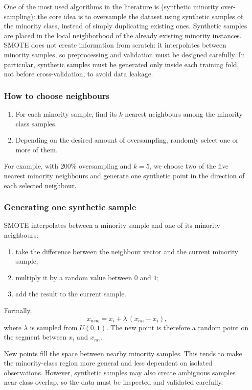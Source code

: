 One of the most used algorithms in the literature is  (synthetic minority over-sampling): the core idea is to oversample the dataset using synthetic samples of the minority class, instead of simply duplicating existing ones. Synthetic samples are placed in the local neighborhood of the already existing minority instances. SMOTE does not create information from scratch: it interpolates between minority samples, so preprocessing and validation must be designed carefully. In particular, synthetic samples must be generated only inside each training fold, not before cross-validation, to avoid data leakage.

\subsubsection{How to choose neighbours}

\begin{enumerate}
  \item For each minority sample, find its $k$ nearest neighbours among the minority class samples.
  \item Depending on the desired amount of oversampling, randomly select one or more of them.
\end{enumerate}
For example, with $200\%$ oversampling and $k = 5$, we choose two of the five nearest minority neighbours and generate one synthetic point in the direction of each selected neighbour.

\subsubsection{Generating one synthetic sample}

SMOTE interpolates between a minority sample and one of its minority neighbours:
\begin{enumerate}
  \item take the difference between the neighbour vector and the current minority sample;
  \item multiply it by a random value between $0$ and $1$;
  \item add the result to the current sample.
\end{enumerate}
Formally,
\[
  x_{new} = x_i + \lambda\,(x_{nn} - x_i),
\]
where $\lambda$ is sampled from $U(0,1)$. The new point is therefore a random point on the segment between $x_i$ and $x_{nn}$.

\begin{center}
\end{center}

New points fill the space between nearby minority samples. This tends to make the minority-class region more general and less dependent on isolated observations. However, synthetic samples may also create ambiguous samples near class overlap, so the data must be inspected and validated carefully.
